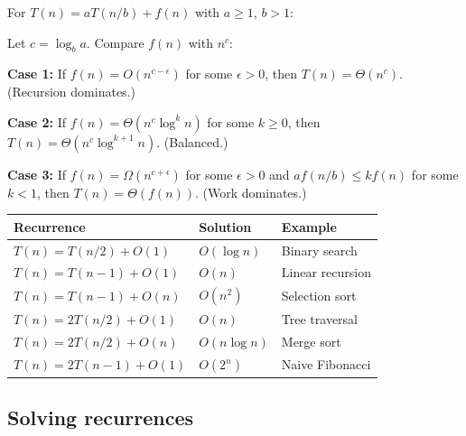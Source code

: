 \begin{theorem}
For $T(n) = aT(n/b) + f(n)$ with $a \geq 1$, $b > 1$:

Let $c = \log_b a$. Compare $f(n)$ with $n^c$:

\textbf{Case 1:} If $f(n) = O(n^{c - \epsilon})$ for some $\epsilon > 0$, then $T(n) = \Theta(n^c)$.
(Recursion dominates.)

\textbf{Case 2:} If $f(n) = \Theta(n^c \log^k n)$ for some $k \geq 0$, then $T(n) = \Theta(n^c \log^{k+1} n)$.
(Balanced.)

\textbf{Case 3:} If $f(n) = \Omega(n^{c + \epsilon})$ for some $\epsilon > 0$ and $af(n/b) \leq kf(n)$ for some $k < 1$, then $T(n) = \Theta(f(n))$.
(Work dominates.)
\end{theorem}

\begin{theorem}
\begin{center}
\begin{tabular}{lll}
\textbf{Recurrence} & \textbf{Solution} & \textbf{Example} \\
\hline
$T(n) = T(n/2) + O(1)$ & $O(\log n)$ & Binary search \\
$T(n) = T(n-1) + O(1)$ & $O(n)$ & Linear recursion \\
$T(n) = T(n-1) + O(n)$ & $O(n^2)$ & Selection sort \\
$T(n) = 2T(n/2) + O(1)$ & $O(n)$ & Tree traversal \\
$T(n) = 2T(n/2) + O(n)$ & $O(n \log n)$ & Merge sort \\
$T(n) = 2T(n-1) + O(1)$ & $O(2^n)$ & Naive Fibonacci
\end{tabular}
\end{center}
\end{theorem}

\subsection*{Solving recurrences}

